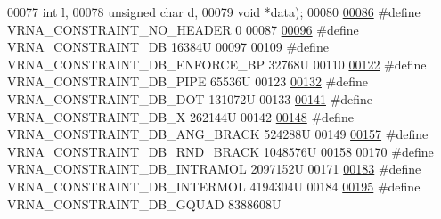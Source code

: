 \begin{DoxyCode}
00077                                                   \textcolor{keywordtype}{int}           l,
00078                                                   \textcolor{keywordtype}{unsigned} \textcolor{keywordtype}{char} d,
00079                                                   \textcolor{keywordtype}{void}          *data);
00080 
\hyperlink{constraints__hard_8h_a08d12a9a846ea593b7171d277c9f033f}{00086} \textcolor{preprocessor}{#define VRNA\_CONSTRAINT\_NO\_HEADER         0}
00087 
\hyperlink{group__hard__constraints_ga4bfc2f15c4f261c62a11af9d2aa80c90}{00096} \textcolor{preprocessor}{#define VRNA\_CONSTRAINT\_DB                16384U}
00097 
\hyperlink{group__hard__constraints_ga29ebe940110d60ab798fdacbcdbbfb7d}{00109} \textcolor{preprocessor}{#define VRNA\_CONSTRAINT\_DB\_ENFORCE\_BP           32768U}
00110 
\hyperlink{group__hard__constraints_ga13053547a2de5532b64b64d35e097ae1}{00122} \textcolor{preprocessor}{#define VRNA\_CONSTRAINT\_DB\_PIPE              65536U}
00123 
\hyperlink{group__hard__constraints_ga369bea82eae75fbe626f409fa425747e}{00132} \textcolor{preprocessor}{#define VRNA\_CONSTRAINT\_DB\_DOT               131072U}
00133 
\hyperlink{group__hard__constraints_ga7283bbe0f8954f7b030ecc3f2d1932b2}{00141} \textcolor{preprocessor}{#define VRNA\_CONSTRAINT\_DB\_X                 262144U}
00142 
\hyperlink{constraints__hard_8h_ad54c1315a47d55653dcaa5de6e544b77}{00148} \textcolor{preprocessor}{#define VRNA\_CONSTRAINT\_DB\_ANG\_BRACK         524288U}
00149 
\hyperlink{group__hard__constraints_gac17b034852c914bc5879954c65d7e74b}{00157} \textcolor{preprocessor}{#define VRNA\_CONSTRAINT\_DB\_RND\_BRACK         1048576U}
00158 
\hyperlink{group__hard__constraints_ga5c17253f5a39d1d49b0fb11f5196982a}{00170} \textcolor{preprocessor}{#define VRNA\_CONSTRAINT\_DB\_INTRAMOL    2097152U}
00171 
\hyperlink{group__hard__constraints_ga31d0ebb9755ca8a4acafc14f00ca755d}{00183} \textcolor{preprocessor}{#define VRNA\_CONSTRAINT\_DB\_INTERMOL    4194304U}
00184 
\hyperlink{group__hard__constraints_ga75cfab03cdc97c95b3ce8bb29f52b08e}{00195} \textcolor{preprocessor}{#define VRNA\_CONSTRAINT\_DB\_GQUAD                8388608U}

\end{DoxyCode}
